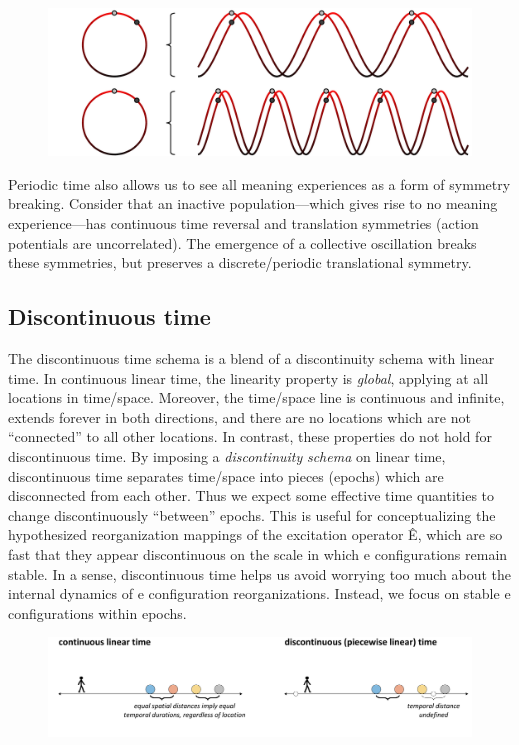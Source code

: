   
\begin{figure}
\includegraphics[width=\textwidth]{figures/Tilsen-img48.png}
\caption{\missingcaption}
\label{fig:}
\end{figure}
 

  Periodic time also allows us to see all meaning experiences as a form of symmetry breaking. Consider that an inactive population—which gives rise to no meaning experience—has continuous time reversal and translation symmetries (action potentials are uncorrelated). The emergence of a collective oscillation breaks these symmetries, but preserves a discrete/periodic translational symmetry.

\subsection{Discontinuous time}

The discontinuous time schema is a blend of a discontinuity schema with linear time. In continuous linear time, the linearity property is \textit{global}, applying at all locations in time/space. Moreover, the time/space line is continuous and infinite, extends forever in both directions, and there are no locations which are not “connected” to all other locations. In contrast, these properties do not hold for discontinuous time. By imposing a \textit{discontinuity} \textit{schema} on linear time, discontinuous time separates time/space into pieces (epochs) which are disconnected from each other. Thus we expect some effective time quantities to change discontinuously “between” epochs. This is useful for conceptualizing the hypothesized reorganization mappings of the excitation operator Ê, which are so fast that they appear discontinuous on the scale in which e configurations remain stable. In a sense, discontinuous time helps us avoid worrying too much about the internal dynamics of e configuration reorganizations. Instead, we focus on stable e configurations within epochs.

  
\begin{figure}
\includegraphics[width=\textwidth]{figures/Tilsen-img49.png}
\caption{\missingcaption}
\label{fig:}
\end{figure}
 

